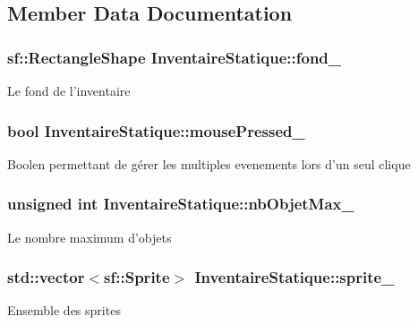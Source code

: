 \subsection{Member Data Documentation}
\hypertarget{classInventaireStatique_ade4aafc789b65459ca3e1e7473c50ed7}{
\subsubsection[{fond\-\_\-}]{\setlength{\rightskip}{0pt plus 5cm}sf\-::\-Rectangle\-Shape Inventaire\-Statique\-::fond\-\_\-\hspace{0.3cm}{\ttfamily [private]}}}\label{classInventaireStatique_ade4aafc789b65459ca3e1e7473c50ed7}
Le fond de l'inventaire \hypertarget{classInventaireStatique_a6ac9746f410426a3fff7a8024e9f4398}{
\subsubsection[{mouse\-Pressed\-\_\-}]{\setlength{\rightskip}{0pt plus 5cm}bool Inventaire\-Statique\-::mouse\-Pressed\-\_\-\hspace{0.3cm}{\ttfamily [private]}}}\label{classInventaireStatique_a6ac9746f410426a3fff7a8024e9f4398}
Boolen permettant de gérer les multiples evenements lors d'un seul clique \hypertarget{classInventaireStatique_a45caa667122e48be58b376e4b4a8f0b8}{
\subsubsection[{nb\-Objet\-Max\-\_\-}]{\setlength{\rightskip}{0pt plus 5cm}unsigned int Inventaire\-Statique\-::nb\-Objet\-Max\-\_\-\hspace{0.3cm}{\ttfamily [private]}}}\label{classInventaireStatique_a45caa667122e48be58b376e4b4a8f0b8}
Le nombre maximum d'objets \hypertarget{classInventaireStatique_a477fb2f26532acbfca2e1a96288668ee}{
\subsubsection[{sprite\-\_\-}]{\setlength{\rightskip}{0pt plus 5cm}std\-::vector$<$sf\-::\-Sprite$>$ Inventaire\-Statique\-::sprite\-\_\-\hspace{0.3cm}{\ttfamily [private]}}}\label{classInventaireStatique_a477fb2f26532acbfca2e1a96288668ee}
Ensemble des sprites 

